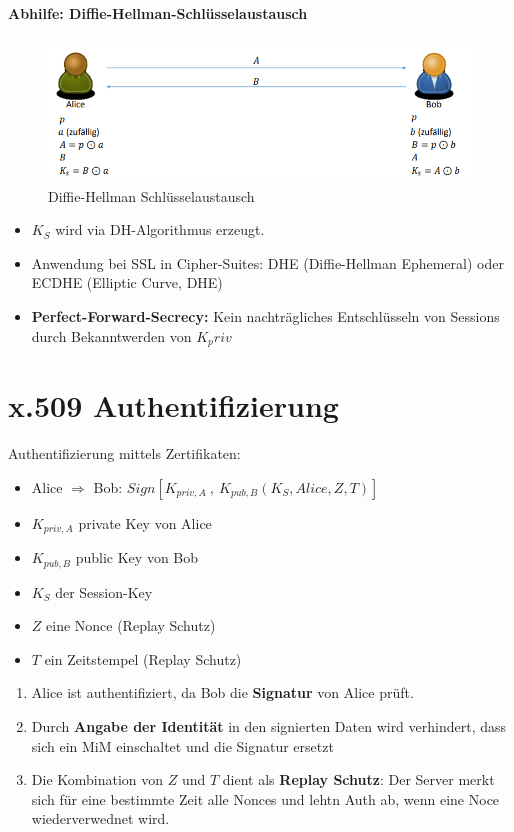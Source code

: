\paragraph{Abhilfe: Diffie-Hellman-Schlüsselaustausch}
\begin{figure}[H]
	\begin{center}
		\includegraphics[scale=0.85]{Resources/DiffieHellman.png}
		\caption{Diffie-Hellman Schlüsselaustausch}
		\label{fig:DiffieHellman.png}
	\end{center}
\end{figure}
\begin{itemize}
	\item $K_S$ wird via DH-Algorithmus erzeugt.
	\item Anwendung bei SSL in Cipher-Suites: DHE (Diffie-Hellman Ephemeral) oder ECDHE (Elliptic Curve, DHE)
	\item \textbf{Perfect-Forward-Secrecy:} Kein nachträgliches Entschlüsseln von Sessions durch Bekanntwerden von $K_priv$ 
\end{itemize}

\section{x.509 Authentifizierung}
Authentifizierung mittels Zertifikaten:
\begin{itemize}
	\item Alice $\Rightarrow$ Bob: $Sign[K_{priv, A} \ , \ K_{pub, B}(K_S, Alice, Z,T)]$
	\item $K_{priv, A}$ private Key von Alice
	\item $K_{pub, B}$ public Key von Bob
	\item $K_S$ der Session-Key
	\item $Z$ eine Nonce (Replay Schutz)
	\item $T$ ein Zeitstempel (Replay Schutz)
\end{itemize}
\begin{enumerate}
	\item Alice ist authentifiziert, da Bob die \textbf{Signatur} von Alice prüft.
	\item Durch \textbf{Angabe der Identität} in den signierten Daten wird verhindert, dass sich ein MiM einschaltet und die Signatur ersetzt
	\item Die Kombination von $Z$ und $T$ dient als \textbf{Replay Schutz}: Der Server merkt sich für eine bestimmte Zeit alle Nonces und lehtn Auth ab, wenn eine Noce wiederverwednet wird.
\end{enumerate}

